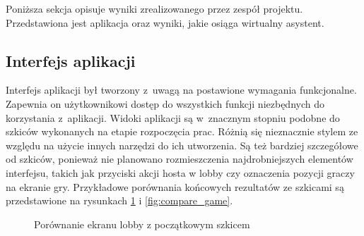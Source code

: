 Poniższa sekcja opisuje wyniki zrealizowanego przez zespół
projektu. Przedstawiona jest aplikacja oraz wyniki, jakie
osiąga wirtualny asystent.

\subsection{Interfejs aplikacji}

Interfejs aplikacji był tworzony z~uwagą na postawione wymagania funkcjonalne.
Zapewnia on użytkownikowi dostęp do wszystkich funkcji niezbędnych do korzystania
z~aplikacji. Widoki aplikacji są w~znacznym stopniu podobne do szkiców wykonanych na etapie
rozpoczęcia prac. Różnią się nieznacznie stylem ze względu na użycie innych narzędzi
do ich utworzenia. Są też bardziej szczegółowe od szkiców, ponieważ nie planowano
rozmieszczenia najdrobniejszych elementów interfejsu, takich jak przyciski akcji hosta
w lobby czy oznaczenia pozycji graczy na ekranie gry. Przykładowe porównania końcowych
rezultatów ze szkicami są przedstawione na rysunkach \ref{fig:compare_lobby} i
\ref{fig:compare_game}.

\begin{figure}[h!]
  \centering
  \hspace*{0.5cm}
  \caption{Porównanie ekranu lobby z początkowym szkicem}
  \label{fig:compare_lobby}
\end{figure}

\FloatBarrier

